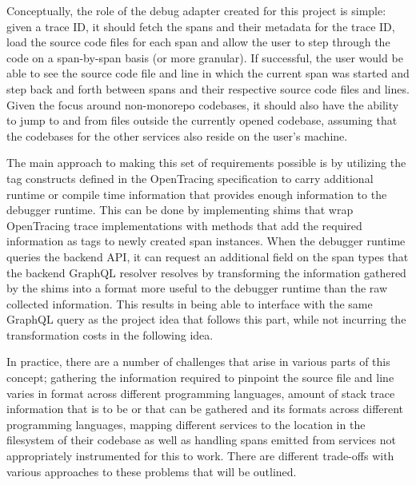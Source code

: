 \documentclass[12pt,pdftex,titlepage]{report}
\begin{document}
                Conceptually, the role of the debug adapter created for this project is simple: given a trace ID, it should fetch the spans and their metadata for the trace ID, load the 
                source code files for each span and allow the user to step through the code on a span-by-span basis (or more granular). If successful, the user would be able to see the
                source code file and line in which the current span was started and step back and forth between spans and their respective source code files and lines. Given the focus
                around non-monorepo codebases, it should also have the ability to jump to and from files outside the currently opened codebase, assuming that the codebases for the other 
                services also reside on the user's machine.
                
                The main approach to making this set of requirements possible is by utilizing the tag constructs defined in the OpenTracing specification to carry additional runtime or
                compile time information that provides enough information to the debugger runtime. This can be done by implementing shims that wrap OpenTracing trace implementations with
                methods that add the required information as tags to newly created span instances. When the debugger runtime queries the backend API, it can request an additional field on
                the span types that the backend GraphQL resolver resolves by transforming the information gathered by the shims into a format more useful to the debugger runtime than the
                raw collected information. This results in being able to interface with the same GraphQL query as the project idea that follows this part, while not incurring the 
                transformation costs in the following idea.

                In practice, there are a number of challenges that arise in various parts of this concept; gathering the information required to pinpoint the source file and line varies 
                in format across different programming languages, amount of stack trace information that is to be or that can be gathered and its formats across different programming 
                languages, mapping different services to the location in the filesystem of their codebase as well as handling spans emitted from services not appropriately instrumented 
                for this to work. There are different trade-offs with various approaches to these problems that will be outlined.
\end{document}
